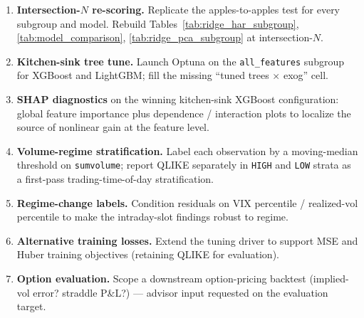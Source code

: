 \begin{enumerate}
    \item \textbf{Intersection-$N$ re-scoring.} Replicate the
      apples-to-apples test for every subgroup and model.
      Rebuild Tables~\ref{tab:ridge_har_subgroup},
      \ref{tab:model_comparison}, \ref{tab:ridge_pca_subgroup} at
      intersection-$N$.
    \item \textbf{Kitchen-sink tree tune.} Launch Optuna on the
      \texttt{all\_features} subgroup for XGBoost and LightGBM; fill
      the missing ``tuned trees $\times$ exog'' cell.
    \item \textbf{SHAP diagnostics} on the winning kitchen-sink XGBoost
      configuration: global feature importance plus dependence /
      interaction plots to localize the source of nonlinear gain at
      the feature level.
    \item \textbf{Volume-regime stratification.} Label each observation
      by a moving-median threshold on \texttt{sumvolume}; report QLIKE
      separately in \texttt{HIGH} and \texttt{LOW} strata as a
      first-pass trading-time-of-day stratification.
    \item \textbf{Regime-change labels.} Condition residuals on
      VIX percentile / realized-vol percentile to make the
      intraday-slot findings robust to regime.
    \item \textbf{Alternative training losses.} Extend the tuning
      driver to support MSE and Huber training objectives
      (retaining QLIKE for evaluation).
    \item \textbf{Option evaluation.} Scope a downstream
      option-pricing backtest (implied-vol error? straddle P\&L?)
      --- advisor input requested on the evaluation target.
\end{enumerate}
